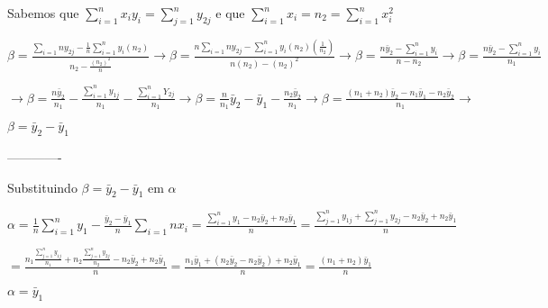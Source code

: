 \documentclass[11pt,]{article}
\begin{document}
Sabemos que \(\sum_{i=1}^n x_{i} y_{i} = \sum_{j=1}^ny_{2j}\) e que
\(\sum_{i=1}^n x_{i} = n_{2} = \sum_{i=1}^n x_{i}^2\)

\(\beta = \frac{\sum_{i=1}{n}y_{2j} - \frac{1}{n} \sum_{i=1}^n y_{i}(n_{2})}{n_{2}- \frac{(n_{2})^2}{n}} \rightarrow \beta = \frac{n \sum_{i=1}{n}y_{2j} - \sum_{i=1}^n y_{i}(n_{2})(\frac{1}{n_{2}})}{n(n_{2})-(n_{2})^2}\rightarrow \beta = \frac{n \bar y_{2} - \sum_{i=1}^n y_{i}}{n-n_{2}}\rightarrow \beta = \frac{n \bar y_{2} - \sum_{i=1}^n y_{i}}{n_{1}}\)

\(\rightarrow \beta = \frac{n \bar y_{2}}{n_{1}} - \frac{ \sum_{i=1}^n y_{1j}}{n_{1}} - \frac{\sum_{i=1}^n Y_{2j}}{n_{1}} \rightarrow \beta = \frac{n}{n_{1}}\bar y_{2} - \bar y_{1} - \frac{n_{2} \bar y_{2}}{n_{1}}\rightarrow \beta = \frac{(n_{1}+n_{2})\bar y_{2} - n_{1}\bar y_{1} - n_{2} \bar y_{2}}{n_{1}} \rightarrow\)

\(\beta = \bar y_{2} - \bar y_{1}\)

-------------

Substituindo \(\beta = \bar y_{2} - \bar y_{1}\) em \(\alpha\)

\(\alpha= \frac{1}{n} \sum_{i=1}^n y_{1} - \frac{ \bar y_{2} - \bar y_{1}}{n} \sum_{i=1}{n}x_{i} = \frac {\sum_{i=1}^n y_{1} - n_{2} \bar y_{2} + n_{2} \bar y_{1}}{n} =\frac {\sum_{j=1}^n y_{1j} + \sum_{j=1}^n y_{2j} - n_{2} \bar y_{2} + n_{2} \bar y_{1}}{n}\)

\(=\frac {n_{1} \frac{\sum_{j=1}^n y_{1j}}{n_{1}} + n_{2} \frac{\sum_{j=1}^n y_{2j}}{n_{2}} - n_{2} \bar y_{2} + n_{2} \bar y_{1}}{n} = \frac{n_{1} \bar y_{1} + (n_{2} \bar y_{2} - n_{2} \bar y_{2}) + n_{2} \bar y_{1}}{n}= \frac{(n_{1}+n_{2}) \bar y_{1}}{n}\)

\(\alpha = \bar y_{1}\)

\newpage
\singlespacing 

\end{document}
